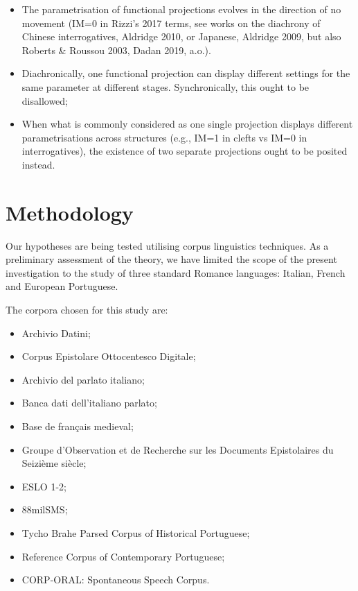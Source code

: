 \documentclass[fleqn,10pt]{wlscirep}
\begin{document}
\begin{itemize}
\item The parametrisation of functional projections evolves in the direction of no movement (IM=0 in Rizzi’s 2017 terms, see works on the diachrony of Chinese interrogatives, Aldridge 2010, or Japanese, Aldridge 2009, but also Roberts & Roussou 2003, Dadan 2019, a.o.).

\item Diachronically, one functional projection can display different settings for the same parameter at different stages. Synchronically, this ought to be disallowed;
\item When what is commonly considered as one single projection displays different parametrisations across structures (e.g., IM=1 in clefts vs IM=0 in interrogatives), the existence of two separate projections ought to be posited instead.
\end{itemize}

\section*{Methodology}

Our hypotheses are being tested utilising corpus linguistics techniques. 
As a preliminary assessment of the theory, we have limited the scope of the present investigation to the study of three standard Romance languages: Italian, French and European Portuguese. 

The corpora chosen for this study are: 

\begin{itemize}
\item Archivio Datini;
\item \vspace*{-2mm} Corpus Epistolare Ottocentesco Digitale;
\item \vspace*{-2mm} Archivio del parlato italiano;
\item \vspace*{-2mm} Banca dati dell’italiano parlato;
\item \vspace*{-2mm} Base de français medieval;
\item \vspace*{-2mm} Groupe d’Observation et de Recherche sur les Documents Epistolaires du Seizième siècle;
\item \vspace*{-2mm} ESLO 1-2;
\item \vspace*{-2mm} 88milSMS; 
\item \vspace*{-2mm} Tycho Brahe Parsed Corpus of Historical Portuguese;
\item \vspace*{-2mm} Reference Corpus of Contemporary Portuguese;
\item \vspace*{-2mm} CORP-ORAL: Spontaneous Speech Corpus.
\end{itemize}
\end{document}
